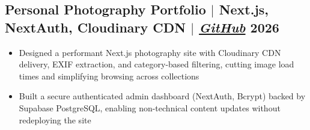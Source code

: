 \documentclass[10pt]{article}
\begin{document}
\subsection{Personal Photography Portfolio {\normalfont $|$ Next.js, NextAuth, Cloudinary CDN} {\normalfont $|$ \href{https://github.com/Hugoyhu/hugohu.me}{\textit{GitHub}}} \hfill 2026}
\begin{itemize}
    \item Designed a performant Next.js photography site with Cloudinary CDN delivery, EXIF extraction, and category-based filtering, cutting image load times and simplifying browsing across collections
    \item Built a secure authenticated admin dashboard (NextAuth, Bcrypt) backed by Supabase PostgreSQL, enabling non-technical content updates without redeploying the site
\end{itemize}
\end{document}
